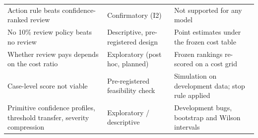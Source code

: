 \begin{widetable}
\begin{tabularx}{\linewidth}{Y l Y}
Action rule beats confidence-ranked review & Confirmatory (I2) & Not supported for any model \\ \addlinespace
No 10\% review policy beats no review & Descriptive, pre-registered design & Point estimates under the frozen cost table \\ \addlinespace
Whether review pays depends on the cost ratio & Exploratory (post hoc, planned) & Frozen rankings re-scored on a cost grid \\ \addlinespace
Case-level score not viable & Pre-registered feasibility check & Simulation on development data; stop rule applied \\ \addlinespace
Primitive confidence profiles, threshold transfer, severity compression & Exploratory / descriptive & Development bugs, bootstrap and Wilson intervals \\
\bottomrule
\end{tabularx}
\end{widetable}

